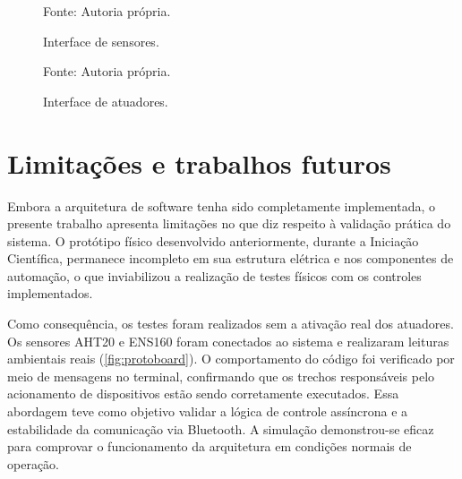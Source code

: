 \begin{figure}[ht]
    \caption{Interface de sensores.}
    \label{fig:sensors}
    \centering
    \hfill
    \hfill

    {\centering\footnotesize Fonte: Autoria própria.\par}

  \end{figure}

  \begin{figure}[ht]
    \caption{Interface de atuadores.}
    \label{fig:actuators}
    \centering
    \hfill
    \hfill

    {\centering\footnotesize Fonte: Autoria própria.\par}

  \end{figure}

\section{Limitações e trabalhos futuros}

Embora a arquitetura de software tenha sido completamente implementada, o presente trabalho apresenta limitações no que diz respeito à validação prática do sistema. O protótipo físico desenvolvido anteriormente, durante a Iniciação Científica, permanece incompleto em sua estrutura elétrica e nos componentes de automação, o que inviabilizou a realização de testes físicos com os controles implementados.
  
Como consequência, os testes foram realizados sem a ativação real dos atuadores. Os sensores AHT20 e ENS160 foram conectados ao sistema e realizaram leituras ambientais reais (\autoref{fig:protoboard}). O comportamento do código foi verificado por meio de mensagens no terminal, confirmando que os trechos responsáveis pelo acionamento de dispositivos estão sendo corretamente executados. Essa abordagem teve como objetivo validar a lógica de controle assíncrona e a estabilidade da comunicação via Bluetooth. A simulação demonstrou-se eficaz para comprovar o funcionamento da arquitetura em condições normais de operação.
  
